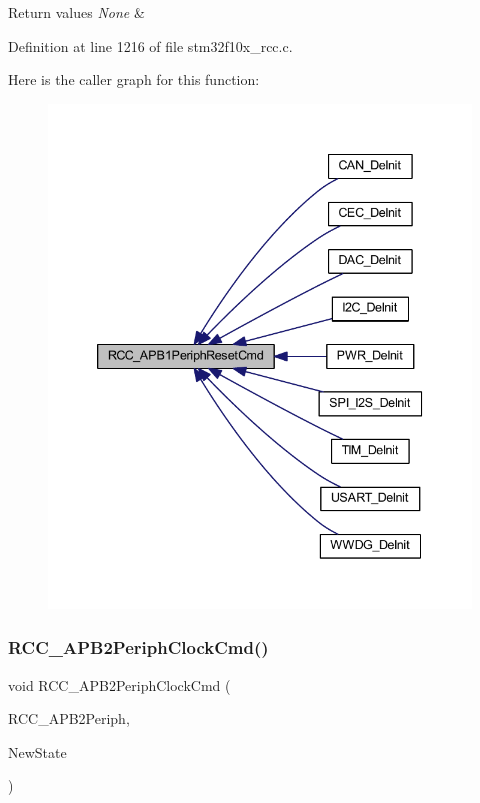 \begin{DoxyRetVals}{Return values}
{\em None} & \\
\hline
\end{DoxyRetVals}


Definition at line 1216 of file stm32f10x\+\_\+rcc.\+c.

Here is the caller graph for this function\+:
\nopagebreak
\begin{figure}[H]
\begin{center}
\leavevmode
\includegraphics[width=339pt]{group___r_c_c___exported___functions_gab197ae4369c10b92640a733b40ed2801_icgraph}
\end{center}
\end{figure}
\mbox{\label{group___r_c_c___exported___functions_ga56ff55caf8d835351916b40dd030bc87}} 
\subsubsection{\texorpdfstring{R\+C\+C\+\_\+\+A\+P\+B2\+Periph\+Clock\+Cmd()}{RCC\_APB2PeriphClockCmd()}}
{\footnotesize\ttfamily void R\+C\+C\+\_\+\+A\+P\+B2\+Periph\+Clock\+Cmd (\begin{DoxyParamCaption}\item[{uint32\+\_\+t}]{R\+C\+C\+\_\+\+A\+P\+B2\+Periph,  }\item[{\hyperlink{group___exported__types_gac9a7e9a35d2513ec15c3b537aaa4fba1}{Functional\+State}}]{New\+State }\end{DoxyParamCaption})}



